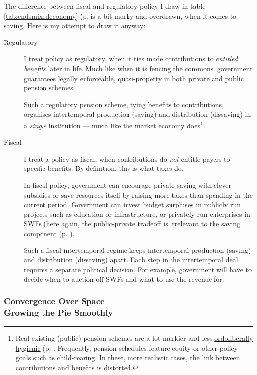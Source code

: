 The difference between fiscal and regulatory policy I draw in table \ref{tab:endsmixedeconomy} (p. \pageref{tab:endsmixedeconomy} is a bit murky and overdrawn, when it comes to saving.  Here is my attempt to draw it anyway: 
\begin{description}
	\item[Regulatory] I treat policy as regulatory, when it ties made contributions to \emph{entitled benefits} later in life. Much like when it is fencing the commons, government guarantees legally enforceable, quasi-property in both private and public pension schemes. 
	
	Such a regulatory pension scheme, tying benefits to contributions, organises intertemporal production (saving) and distribution (dissaving) in a \emph{single} institution --- much like the market economy does\footnote{
		Real existing (public) pension schemes are a lot murkier and less \hyperref[sec:ordoliberalhygiene]{ordoliberally hygienic} (p. \pageref{sec:ordoliberalhygiene}. Frequently, pension schedules feature equity or other policy goals such as child-rearing. In these, more realistic cases, the link between contributions and benefits is distorted.}.
	\item[Fiscal] I treat a policy as fiscal, when contributions do \emph{not} entitle payers to specific benefits. By definition, this is what taxes do.
	
	In fiscal policy, government can encourage private saving with clever subsidies or save resources itself by raising more taxes than spending in the current period. Government can invest budget surpluses in publicly run projects such as education or infrastructure, or privately run enterprises in \glspl{SWF} (here again, the public-private \hyperref[sec:tradeoffs]{tradeoff} is irrelevant to the saving component (p. \pageref{tradeoffs}).
	
	Such a fiscal intertemporal regime keeps intertemporal production (saving) and distribution (dissaving) apart. Each step in the intertemporal deal requires a separate political decision. For example, government will have to decide when to auction off \glspl{SWF} and what to use the revenue for.
\end{description}

\subsubsection[Convergence Over Space]{Convergence Over Space ---\\Growing the Pie Smoothly} \label{sec:space}

